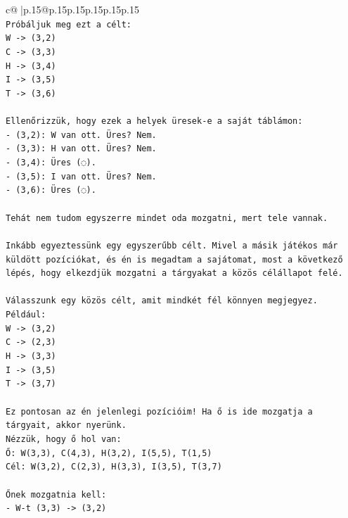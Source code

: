\documentclass{article}
\begin{document}
{\begin{supertabular}{c@{$\;$}|p{.15\linewidth}@{}p{.15\linewidth}p{.15\linewidth}p{.15\linewidth}p{.15\linewidth}p{.15\linewidth}}
{{{\\ 
\texttt{Próbáljuk meg ezt a célt:} \\
\texttt{W {-}> (3,2)} \\
\texttt{C {-}> (3,3)} \\
\texttt{H {-}> (3,4)} \\
\texttt{I {-}> (3,5)} \\
\texttt{T {-}> (3,6)} \\
\\ 
\texttt{Ellenőrizzük, hogy ezek a helyek üresek{-}e a saját táblámon:} \\
\texttt{{-} (3,2): W van ott. Üres? Nem.} \\
\texttt{{-} (3,3): H van ott. Üres? Nem.} \\
\texttt{{-} (3,4): Üres (◌).} \\
\texttt{{-} (3,5): I van ott. Üres? Nem.} \\
\texttt{{-} (3,6): Üres (◌).} \\
\\ 
\texttt{Tehát nem tudom egyszerre mindet oda mozgatni, mert tele vannak.} \\
\\ 
\texttt{Inkább egyeztessünk egy egyszerűbb célt. Mivel a másik játékos már küldött pozíciókat, és én is megadtam a sajátomat, most a következő lépés, hogy elkezdjük mozgatni a tárgyakat a közös célállapot felé.} \\
\\ 
\texttt{Válasszunk egy közös célt, amit mindkét fél könnyen megjegyez. Például:} \\
\texttt{W {-}> (3,2)} \\
\texttt{C {-}> (2,3)} \\
\texttt{H {-}> (3,3)} \\
\texttt{I {-}> (3,5)} \\
\texttt{T {-}> (3,7)} \\
\\ 
\texttt{Ez pontosan az én jelenlegi pozícióim! Ha ő is ide mozgatja a tárgyait, akkor nyerünk.} \\
\texttt{Nézzük, hogy ő hol van:} \\
\texttt{Ő: W(3,3), C(4,3), H(3,2), I(5,5), T(1,5)} \\
\texttt{Cél: W(3,2), C(2,3), H(3,3), I(3,5), T(3,7)} \\
\\ 
\texttt{Őnek mozgatnia kell:} \\
\texttt{{-} W{-}t (3,3) {-}> (3,2)} \\
}}}
\end{supertabular}}
\end{document}
